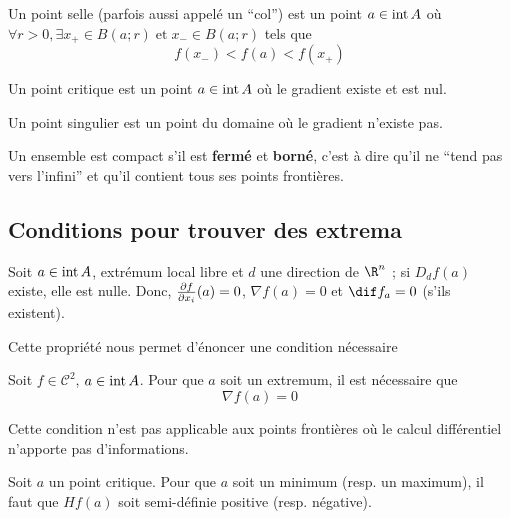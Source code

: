 \begin{mydef}
	Un point selle (parfois aussi appelé un ``col'') est un point $a \in \operatorname{int} A$ où $\forall r > 0, \exists x_+ \in B(a;r) \; \text{et} \; x_- \in B(a;r)$ tels que
	\[ f(x_-) < f(a) < f(x_+) \]
\end{mydef}

\begin{mydef}
	Un point critique est un point $a \in \operatorname{int} A$ où le gradient existe et est nul.
\end{mydef}

\begin{mydef}
	Un point singulier est un point du domaine où le gradient n'existe pas.
\end{mydef}

\begin{mydef}
	Un  ensemble est compact s'il est \textbf{fermé} et \textbf{borné},
	c'est à dire qu'il ne ``tend pas vers l'infini'' et qu'il contient tous ses points frontières.
\end{mydef}

\subsection{Conditions pour trouver des extrema}

\begin{myprop}
	Soit $a \in \operatorname{int} A$, extrémum local libre et $d$ une direction de $\R^n$ ; si $D_df(a)$ existe, elle est nulle. Donc, $\frac{\partial f}{\partial x_i}(a) = 0$, $\nabla f(a) = 0$ et $\dif f_a = 0$ (s'ils existent).
\end{myprop}
Cette propriété nous permet d'énoncer une condition nécessaire
\begin{myprop}
	Soit $f \in \mathcal{C}^2$, $a \in \operatorname{int} A$. Pour que $a$ soit un extremum, il est nécessaire que
	\[ \nabla f(a) = 0 \]
\end{myprop}

\begin{myrem}
	Cette condition n'est pas applicable aux points frontières où le calcul différentiel n'apporte pas d'informations.
\end{myrem}

\begin{myprop}
	Soit $a$ un point critique. Pour que $a$ soit un minimum (resp. un maximum),
    il faut que $Hf(a)$ soit semi-définie positive (resp. négative).
\end{myprop}

